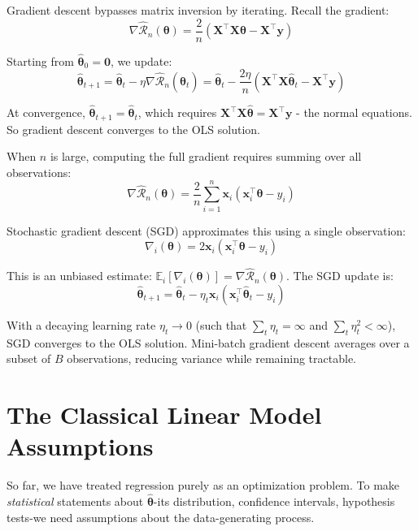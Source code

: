 \documentclass[main.tex]{subfiles}
\begin{document}
Gradient descent bypasses matrix inversion by iterating. Recall the gradient:
$$\nabla\hat{\mathcal{R}}_n(\boldsymbol{\theta}) = \frac{2}{n}\left(\mathbf{X}^\top\mathbf{X}\boldsymbol{\theta} - \mathbf{X}^\top\mathbf{y}\right)$$

Starting from $\hat{\boldsymbol{\theta}}_0 = \mathbf{0}$, we update:
$$\hat{\boldsymbol{\theta}}_{t+1} = \hat{\boldsymbol{\theta}}_t - \eta \nabla\hat{\mathcal{R}}_n(\hat{\boldsymbol{\theta}}_t) = \hat{\boldsymbol{\theta}}_t - \frac{2\eta}{n}\left(\mathbf{X}^\top\mathbf{X}\hat{\boldsymbol{\theta}}_t - \mathbf{X}^\top\mathbf{y}\right)$$

At convergence, $\hat{\boldsymbol{\theta}}_{t+1} = \hat{\boldsymbol{\theta}}_t$, which requires $\mathbf{X}^\top\mathbf{X}\hat{\boldsymbol{\theta}} = \mathbf{X}^\top\mathbf{y}$ - the normal equations. So gradient descent converges to the OLS solution.

When $n$ is large, computing the full gradient requires summing over all observations:
$$\nabla\hat{\mathcal{R}}_n(\boldsymbol{\theta}) = \frac{2}{n}\sum_{i=1}^{n}\mathbf{x}_i(\mathbf{x}_i^\top\boldsymbol{\theta} - y_i)$$

Stochastic gradient descent (SGD) approximates this using a single observation:
$$\nabla_i(\boldsymbol{\theta}) = 2\mathbf{x}_i(\mathbf{x}_i^\top\boldsymbol{\theta} - y_i)$$

This is an unbiased estimate: $\mathbb{E}_i[\nabla_i(\boldsymbol{\theta})] = \nabla\hat{\mathcal{R}}_n(\boldsymbol{\theta})$. The SGD update is:
$$\hat{\boldsymbol{\theta}}_{t+1} = \hat{\boldsymbol{\theta}}_t - \eta_t \mathbf{x}_i(\mathbf{x}_i^\top\hat{\boldsymbol{\theta}}_t - y_i)$$

With a decaying learning rate $\eta_t \to 0$ (such that $\sum_t \eta_t = \infty$ and $\sum_t \eta_t^2 < \infty$), SGD converges to the OLS solution. Mini-batch gradient descent averages over a subset of $B$ observations, reducing variance while remaining tractable.

\needspace{0.33\textheight}
\section{The Classical Linear Model Assumptions}

So far, we have treated regression purely as an optimization problem. To make \textit{statistical} statements about $\hat{\boldsymbol{\theta}}$-its distribution, confidence intervals, hypothesis tests-we need assumptions about the data-generating process.
\end{document}
